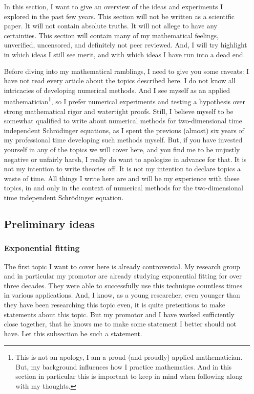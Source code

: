 In this section, I want to give an overview of the ideas and experiments I explored in the past few years. This section will not be written as a scientific paper. It will not contain absolute truths. It will not allege to have any certainties. This section will contain many of my mathematical feelings, unverified, uncensored, and definitely not peer reviewed. And, I will try highlight in which ideas I still see merit, and with which ideas I have run into a dead end.

Before diving into my mathematical ramblings, I need to give you some caveats: I have not read every article about the topics described here. I do not know all intricacies of developing numerical methods. And I see myself as an applied mathematician\footnote{This is not an apology, I am a proud (and proudly) applied mathematician. But, my background influences how I practice mathematics. And in this section in particular this is important to keep in mind when following along with my thoughts.}, so I prefer numerical experiments and testing a hypothesis over strong mathematical rigor and watertight proofs. Still, I believe myself to be somewhat qualified to write about numerical methods for two-dimensional time independent Schrödinger equations, as I spent the previous (almost) six years of my professional time developing such methods myself. But, if you have invested yourself in any of the topics we will cover here, and you find me to be unjustly negative or unfairly harsh, I really do want to apologize in advance for that. It is not my intention to write theories off. It is not my intention to declare topics a waste of time. All things I write here are and will be my experience with these topics, in and only in the context of numerical methods for the two-dimensional time independent Schrödinger equation.

\subsection{Preliminary ideas}

\subsubsection{Exponential fitting}

The first topic I want to cover here is already controversial. My research group and in particular my promotor are already studying exponential fitting for over three decades. They were able to successfully use this technique countless times in various applications. And, I know, as a young researcher, even younger than they have been researching this topic even, it is quite pretentious to make statements about this topic. But my promotor and I have worked sufficiently close together, that he knows me to make some statement I better should not have. Let this subsection be such a statement.

